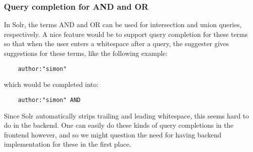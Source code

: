 \subsubsection{Query completion for AND and OR}

In Solr, the terms AND and OR can be used for intersection and union queries, respectively. 
A nice feature would be to support query completion for these terms so that when the user enters a whitespace after a query, the suggester gives suggestions for these terms, like the following example:
\begin{verbatim}
    author:"simon" 
\end{verbatim}
which would be completed into:
\begin{verbatim}
    author:"simon" AND
\end{verbatim}
Since Solr automatically strips trailing and leading whitespace, this seems hard to do in the backend. One can easily do these kinds of query completions in the frontend however, and so we might question the need for having backend implementation for these in the first place.




